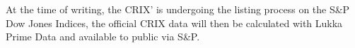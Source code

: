 At the time of writing, the CRIX' is undergoing the listing process on the S\&P Dow Jones Indices,
the official CRIX data will then be calculated with Lukka Prime Data and available to public via S\&P.



















%
%
%
